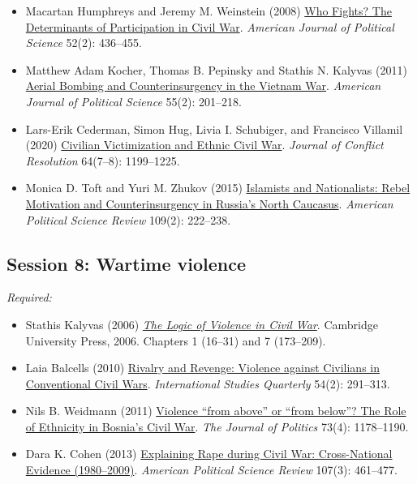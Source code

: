 \documentclass[12pt, a4paper]{article}
\begin{document}
\begin{itemize}
	\item Macartan Humphreys and Jeremy M. Weinstein (2008) \href{https://doi.org/10.1111/j.1540-5907.2008.00322.x}{Who Fights? The Determinants of Participation in Civil War}. \textit{American Journal of Political Science} 52(2): 436--455.
	\item Matthew Adam Kocher, Thomas B. Pepinsky and Stathis N. Kalyvas (2011) \href{https://doi.org/10.1111/j.1540-5907.2010.00498.x}{Aerial Bombing and Counterinsurgency in the Vietnam War}. \textit{American Journal of Political Science} 55(2): 201--218.
  \item Lars-Erik Cederman, Simon Hug, Livia I. Schubiger, and Francisco Villamil (2020) \href{https://doi.org/10.1177/0022002719898873}{Civilian Victimization and Ethnic Civil War}. \textit{Journal of Conflict Resolution} 64(7–8): 1199--1225.
	\item Monica D. Toft and Yuri M. Zhukov (2015) \href{https://doi.org/10.1017/S000305541500012X}{Islamists and Nationalists: Rebel Motivation and Counterinsurgency in Russia's North Caucasus}. \textit{American Political Science Review} 109(2): 222--238.
\end{itemize}



\vspace{20pt}
\hline
\subsection*{Session 8: Wartime violence}

\noindent\textit{Required:}

\begin{itemize}
  \item Stathis Kalyvas (2006) \href{https://bibliotecas.uc3m.es/permalink/f/1nggclj/34UC3M_ALMA21161986050004213}{\textit{The Logic of Violence in Civil War}}. Cambridge University Press, 2006. Chapters 1 (16--31) and 7 (173--209).
  \item Laia Balcells (2010) \href{https://doi.org/10.1111/j.1468-2478.2010.00588.x}{Rivalry and Revenge: Violence against Civilians in Conventional Civil Wars}. \textit{International Studies Quarterly} 54(2): 291--313.
  \item Nils B. Weidmann (2011) \href{https://doi.org/10.1017/S0022381611000831}{Violence ``from above'' or ``from below''? The Role of Ethnicity in Bosnia’s Civil War}. \textit{The Journal of Politics} 73(4): 1178--1190.
  \item Dara K. Cohen (2013) \href{https://doi.org/10.1017/S0003055413000221}{Explaining Rape during Civil War: Cross-National Evidence (1980–2009)}. \textit{American Political Science Review} 107(3): 461--477.
\end{itemize}
\end{document}
